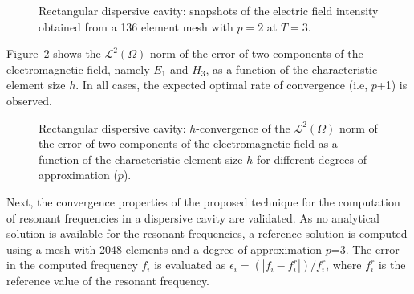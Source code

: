 \begin{figure}[!ht]
	\centering
	\caption{Rectangular dispersive cavity: snapshots of the electric field intensity obtained from a 136 element mesh with $p=2$ at $T=3$.}
	\label{fig:rectangle2DdispersiveTest_Convergence}
\end{figure}

Figure~\ref{fig:rectangle2DdispersiveTest_Convergence} shows the $\mathcal{L}^2(\Omega)$ norm of the error of two components of the electromagnetic field, namely $E_1$ and $H_3$, as a function of the characteristic element size $h$. In all cases, the expected optimal rate of convergence (i.e, $p$+1) is observed. 
\begin{figure}[!ht]
	\centering
	\caption{Rectangular dispersive cavity: $h$-convergence of the $\mathcal{L}^2(\Omega)$ norm of the error of two components of the electromagnetic field as a function of the characteristic element size $h$ for different degrees of approximation ($p$).}
	\label{fig:rectangle2DdispersiveTest_Convergence}
\end{figure}
Next, the convergence properties of the proposed technique for the computation of resonant frequencies in a dispersive cavity are validated. As no analytical solution is available for the resonant frequencies, a reference solution is computed using a mesh with 2048 elements and a degree of approximation $p$=3.  The error in the computed frequency $f_i$ is evaluated as $\epsilon_i = (|f_i - f_i^r|)/f_i^r$, where $f_i^r$ is the reference value of the resonant frequency.

